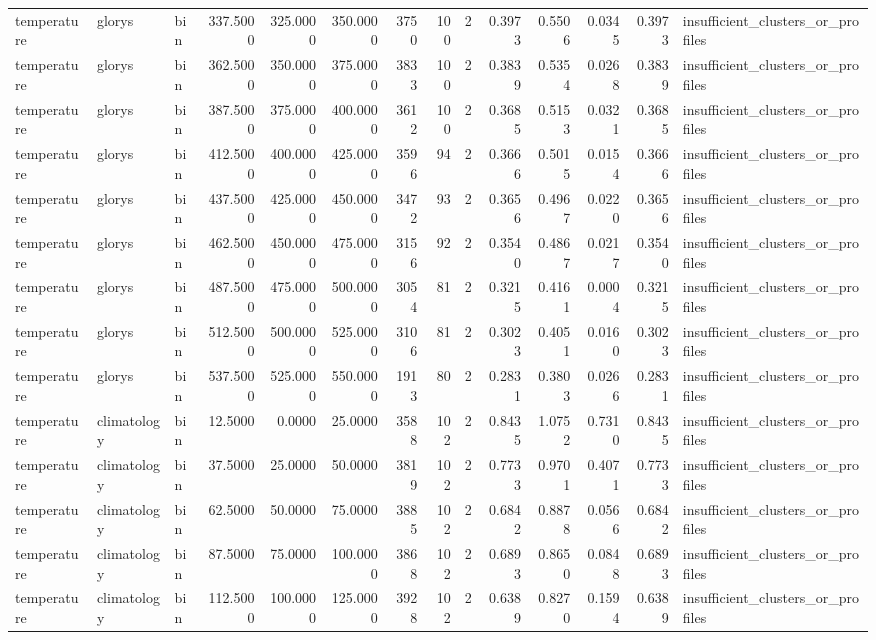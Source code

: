 \begin{tabular}{lllrrrrrrrrrrl}
temperature & glorys & bin & 337.5000 & 325.0000 & 350.0000 & 3750 & 100 & 2 & 0.3973 & 0.5506 & 0.0345 & 0.3973 & insufficient_clusters_or_profiles \\
temperature & glorys & bin & 362.5000 & 350.0000 & 375.0000 & 3833 & 100 & 2 & 0.3839 & 0.5354 & 0.0268 & 0.3839 & insufficient_clusters_or_profiles \\
temperature & glorys & bin & 387.5000 & 375.0000 & 400.0000 & 3612 & 100 & 2 & 0.3685 & 0.5153 & 0.0321 & 0.3685 & insufficient_clusters_or_profiles \\
temperature & glorys & bin & 412.5000 & 400.0000 & 425.0000 & 3596 & 94 & 2 & 0.3666 & 0.5015 & 0.0154 & 0.3666 & insufficient_clusters_or_profiles \\
temperature & glorys & bin & 437.5000 & 425.0000 & 450.0000 & 3472 & 93 & 2 & 0.3656 & 0.4967 & 0.0220 & 0.3656 & insufficient_clusters_or_profiles \\
temperature & glorys & bin & 462.5000 & 450.0000 & 475.0000 & 3156 & 92 & 2 & 0.3540 & 0.4867 & 0.0217 & 0.3540 & insufficient_clusters_or_profiles \\
temperature & glorys & bin & 487.5000 & 475.0000 & 500.0000 & 3054 & 81 & 2 & 0.3215 & 0.4161 & 0.0004 & 0.3215 & insufficient_clusters_or_profiles \\
temperature & glorys & bin & 512.5000 & 500.0000 & 525.0000 & 3106 & 81 & 2 & 0.3023 & 0.4051 & 0.0160 & 0.3023 & insufficient_clusters_or_profiles \\
temperature & glorys & bin & 537.5000 & 525.0000 & 550.0000 & 1913 & 80 & 2 & 0.2831 & 0.3803 & 0.0266 & 0.2831 & insufficient_clusters_or_profiles \\
temperature & climatology & bin & 12.5000 & 0.0000 & 25.0000 & 3588 & 102 & 2 & 0.8435 & 1.0752 & 0.7310 & 0.8435 & insufficient_clusters_or_profiles \\
temperature & climatology & bin & 37.5000 & 25.0000 & 50.0000 & 3819 & 102 & 2 & 0.7733 & 0.9701 & 0.4071 & 0.7733 & insufficient_clusters_or_profiles \\
temperature & climatology & bin & 62.5000 & 50.0000 & 75.0000 & 3885 & 102 & 2 & 0.6842 & 0.8878 & 0.0566 & 0.6842 & insufficient_clusters_or_profiles \\
temperature & climatology & bin & 87.5000 & 75.0000 & 100.0000 & 3868 & 102 & 2 & 0.6893 & 0.8650 & 0.0848 & 0.6893 & insufficient_clusters_or_profiles \\
temperature & climatology & bin & 112.5000 & 100.0000 & 125.0000 & 3928 & 102 & 2 & 0.6389 & 0.8270 & 0.1594 & 0.6389 & insufficient_clusters_or_profiles \\

\end{tabular}

